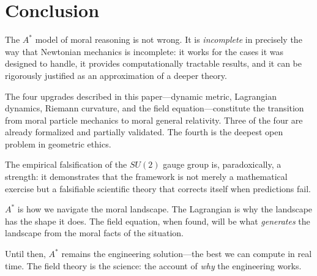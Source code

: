 \documentclass[12pt]{article}
\theoremstyle{definition}
\theoremstyle{remark}
\begin{document}
\section{Conclusion}
\label{sec:conclusion}

The $A^*$ model of moral reasoning is not wrong. It is \emph{incomplete} in precisely the way that Newtonian mechanics is incomplete: it works for the cases it was designed to handle, it provides computationally tractable results, and it can be rigorously justified as an approximation of a deeper theory.

The four upgrades described in this paper---dynamic metric, Lagrangian dynamics, Riemann curvature, and the field equation---constitute the transition from moral particle mechanics to moral general relativity. Three of the four are already formalized and partially validated. The fourth is the deepest open problem in geometric ethics.

The empirical falsification of the $SU(2)$ gauge group is, paradoxically, a strength: it demonstrates that the framework is not merely a mathematical exercise but a falsifiable scientific theory that corrects itself when predictions fail.

$A^*$ is how we navigate the moral landscape. The Lagrangian is why the landscape has the shape it does. The field equation, when found, will be what \emph{generates} the landscape from the moral facts of the situation.

Until then, $A^*$ remains the engineering solution---the best we can compute in real time. The field theory is the science: the account of \emph{why} the engineering works.



\end{document}

